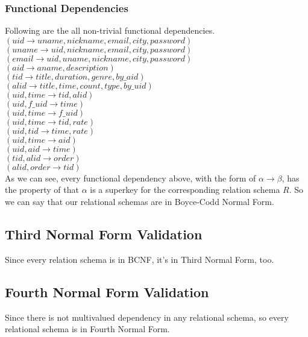 \documentclass[letter, 12pt]{report}
\begin{document}
	\subsubsection{Functional Dependencies}
	Following are the all non-trivial functional dependencies.\\
	$(uid\to uname, nickname, email, city, password)$\\
	$(uname\to uid, nickname, email, city, password)$\\
	$(email\to uid, uname ,nickname, city, password)$\\
	$(aid\to aname, description)$\\
	$(tid\to title, duration, genre, by\_aid)$\\
	$(alid\to title, time, count, type, by\_uid)$\\
	$(uid, time\to tid, alid)$\\
	$(uid, f\_uid\to time)$\\
	$(uid, time\to f\_uid)$\\
	$(uid, time\to tid, rate)$\\
	$(uid, tid\to time, rate)$\\
	$(uid, time\to aid)$\\
	$(uid, aid\to time)$\\
	$(tid, alid\to order)$\\
	$(alid, order\to tid)$\\
	As we can see, every functional dependency above, with the form of $\alpha \to \beta$, has the property of that $\alpha$ is a superkey for the corresponding relation schema $R$. So we can say that our relational schemas are in Boyce-Codd Normal Form.
	
	\subsection{Third Normal Form Validation}
	Since every relation schema is in BCNF, it's in Third Normal Form, too.
	\subsection{Fourth Normal Form Validation}
	Since there is not multivalued dependency in any relational schema, so every relational schema is in Fourth Normal Form.
\end{document}
